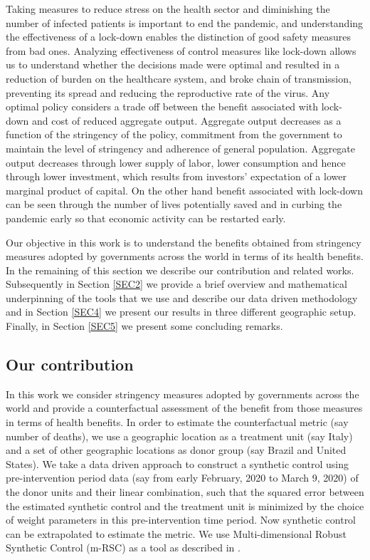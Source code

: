 \documentclass[fleqn,10pt]{wlscirep}
\begin{document}
	Taking measures to reduce stress on the health sector and diminishing the number of infected patients is important to end the pandemic, and understanding the effectiveness of a lock-down enables the distinction of good safety measures from bad ones. Analyzing effectiveness of control measures like lock-down allows us to understand whether the decisions made were optimal and resulted in a reduction of burden on the healthcare system, and broke chain of transmission, preventing its spread and reducing the reproductive rate of the virus. Any optimal policy considers a trade off between the benefit associated with lock-down and cost of reduced aggregate output. Aggregate output decreases as a function of the stringency of the policy, commitment from the government to maintain the level of stringency and adherence of general population. Aggregate output decreases through lower supply of labor, lower consumption and hence through lower investment, which results from investors’ expectation of a lower marginal product of capital. On the other hand benefit associated with lock-down can be seen through the number of lives potentially saved and in curbing the pandemic early so that economic activity can be restarted early. 
	
	Our objective in this work is to understand the benefits obtained from stringency measures adopted by governments across the world in terms of its health benefits. In the remaining of this section we describe our contribution and related  works. Subsequently in Section \ref{SEC2} we provide a brief overview and mathematical underpinning of the tools that we use and describe our data driven methodology and in Section \ref{SEC4} we present our results in three different geographic setup. Finally, in Section \ref{SEC5} we present some concluding remarks.
	
	\subsection*{Our contribution}
	In this work we consider stringency measures adopted by governments across the world and provide a counterfactual assessment of the benefit from those measures in terms of health benefits. In order to estimate the counterfactual metric (say number of deaths), we use a geographic location as a treatment unit (say Italy) and a set of other geographic locations as donor group (say Brazil and United States). We take a data driven approach to construct a synthetic control \cite{ap08746, JMLR18, AMSS19} using pre-intervention period data (say from early February, 2020 to March 9, 2020) of the donor units and their linear combination, such that the squared error between the estimated synthetic control  and the treatment unit is minimized by the choice of weight parameters in this pre-intervention time period. Now synthetic control can be extrapolated to estimate the metric. We use Multi-dimensional Robust Synthetic Control (m-RSC) as a tool as described in \cite{AMSS19}. 
	
\end{document}

